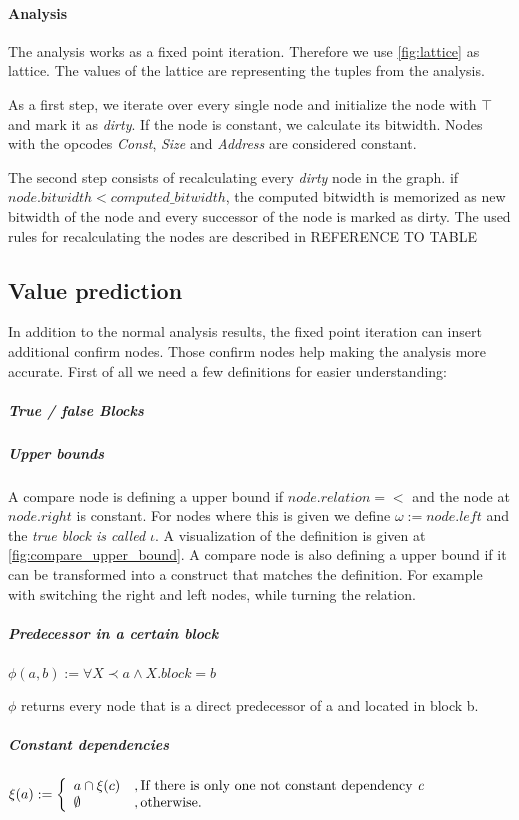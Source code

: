

\paragraph{Analysis} The analysis works as a fixed point iteration. Therefore we use  \ref{fig:lattice} as lattice. The values of the lattice are representing the tuples from the analysis.

As a first step, we iterate over every single node and initialize the node with $\top$ and mark it as \textit{dirty}. If the node is constant, we calculate its bitwidth. Nodes with the opcodes \textit{Const}, \textit{Size} and \textit{Address} are considered constant.

The second step consists of recalculating every \textit{dirty} node in the graph. if $node.bitwidth < computed\_bitwidth$, the computed bitwidth is memorized as new bitwidth of the node and every successor of the node is marked as dirty. The used rules for recalculating the nodes are described in REFERENCE TO TABLE %

\subsection{Value prediction}
In addition to the normal analysis results, the fixed point iteration can insert additional 
confirm nodes. Those confirm nodes help making the analysis more accurate.
First of all we need a few definitions for easier understanding:

\subparagraph{True / false Blocks}

\subparagraph{Upper bounds}

A compare node is defining a upper bound if $node.relation = <$ and the node at $node.right$ is constant. For nodes where this is given we define
\emph{$\omega := node.left$} and the \emph{true block is called $\iota$}. A visualization of the definition is given at \ref{fig:compare_upper_bound}.
A compare node is also defining a upper bound if it can be transformed into a construct that matches the definition. For example with switching the right and left nodes, while turning the relation.
\subparagraph{Predecessor in a certain block}
\begin{center}
$\phi(a, b) := \forall X \prec a \wedge X.block = b$ 
\end{center}
$\phi$ returns every node that is a direct predecessor of a and located in block b.
\subparagraph{Constant dependencies}
\begin{center}
$\xi(a) := 
\left\{
	\begin{array}{l}
		a \cap \xi(c)\\ 
		\emptyset
	\end{array}
	\begin{array}{l}
		, \text{If there is only one not constant dependency \textit{c}} \\ 
		, \text{otherwise}.
	\end{array}
\right.$
\end{center}

